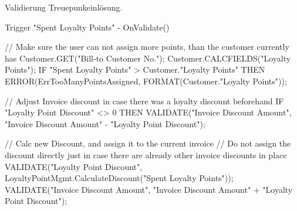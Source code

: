 \pagebreak

\begin{program}  %
	\caption{Validierung Treuepunkeinlösung.}
	\label{prog:PointEntryValidation}
	\begin{JavaCode}
Trigger "Spent Loyalty Points" - OnValidate()

// Make sure the user can not assign more points, than the customer currently has
Customer.GET("Bill-to Customer No.");
Customer.CALCFIELDS("Loyalty Points");
IF "Spent Loyalty Points" > Customer."Loyalty Points" THEN
  ERROR(ErrTooManyPointsAssigned, FORMAT(Customer."Loyalty Points"));

// Adjust Invoice discount in case there was a loyalty discount beforehand
IF "Loyalty Point Discount" <> 0 THEN
  VALIDATE("Invoice Discount Amount", 
           "Invoice Discount Amount" - "Loyalty Point Discount");

// Calc new Discount, and assign it to the current invoice
// Do not assign the discount directly just in case there are already other invoice discounts in place
VALIDATE("Loyalty Point Discount", 
         LoyaltyPointMgmt.CalculateDiscount("Spent Loyalty Points"));
VALIDATE("Invoice Discount Amount", 
         "Invoice Discount Amount" + "Loyalty Point Discount");
	\end{JavaCode}
\end{program}

\newcommand{\code}[1]{\colorbox{light-gray}{\texttt{#1}}}


